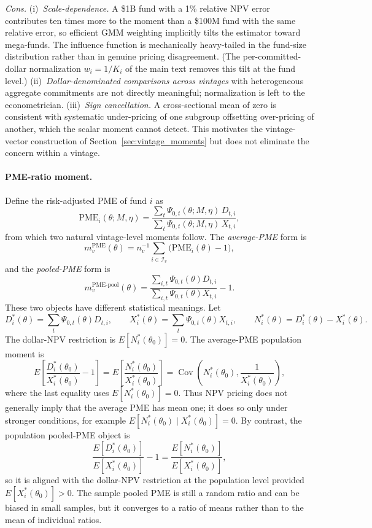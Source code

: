 \documentclass[11pt]{article}
\begin{document}
\emph{Cons.}
(i)~\emph{Scale-dependence.} A \$1B fund with a 1\% relative NPV error
contributes ten times more to the moment than a \$100M fund with the same
relative error, so efficient GMM weighting implicitly tilts the estimator
toward mega-funds. The influence function is mechanically heavy-tailed in
the fund-size distribution rather than in genuine pricing disagreement.
(The per-committed-dollar normalization \(w_i=1/K_i\) of the main text
removes this tilt at the fund level.)
(ii)~\emph{Dollar-denominated comparisons across vintages} with
heterogeneous aggregate commitments are not directly meaningful; normalization
is left to the econometrician.
(iii)~\emph{Sign cancellation.} A cross-sectional mean of zero is consistent
with systematic under-pricing of one subgroup offsetting over-pricing of
another, which the scalar moment cannot detect. This motivates the
vintage-vector construction of Section~\ref{sec:vintage_moments} but does not
eliminate the concern within a vintage.

\paragraph{PME-ratio moment.}
Define the risk-adjusted PME of fund \(i\) as
\[
\mathrm{PME}_i(\theta;M,\eta)
=\frac{\sum_{t}\Psi_{0,t}(\theta;M,\eta)\,D_{t,i}}
{\sum_{t}\Psi_{0,t}(\theta;M,\eta)\,X_{t,i}},
\]
from which two natural vintage-level moments follow. The \emph{average-PME}
form is
\[
m^{\mathrm{PME}}_{v}(\theta)
=
n_v^{-1}
\sum_{i\in \mathcal I_v}\bigl(\mathrm{PME}_i(\theta)-1\bigr),
\]
and the \emph{pooled-PME} form is
\[
m^{\mathrm{PME\text{-}pool}}_{v}(\theta)
=
\frac{\sum_{i,t}\Psi_{0,t}(\theta)D_{t,i}}
{\sum_{i,t}\Psi_{0,t}(\theta)X_{t,i}}
-1.
\]
These two objects have different statistical meanings. Let
\[
D_i^\ast(\theta)=\sum_t\Psi_{0,t}(\theta)D_{t,i},
\qquad
X_i^\ast(\theta)=\sum_t\Psi_{0,t}(\theta)X_{t,i},
\qquad
N_i^\ast(\theta)=D_i^\ast(\theta)-X_i^\ast(\theta).
\]
The dollar-NPV restriction is \(E[N_i^\ast(\theta_0)]=0\). The average-PME
population moment is
\[
E\!\left[\frac{D_i^\ast(\theta_0)}{X_i^\ast(\theta_0)}-1\right]
=
E\!\left[\frac{N_i^\ast(\theta_0)}{X_i^\ast(\theta_0)}\right]
=
\operatorname{Cov}\!\left(N_i^\ast(\theta_0),\frac{1}{X_i^\ast(\theta_0)}\right),
\]
where the last equality uses \(E[N_i^\ast(\theta_0)]=0\). Thus NPV pricing
does not generally imply that the average PME has mean one; it does so only
under stronger conditions, for example \(E[N_i^\ast(\theta_0)\mid
X_i^\ast(\theta_0)]=0\). By contrast, the population pooled-PME object is
\[
\frac{E[D_i^\ast(\theta_0)]}{E[X_i^\ast(\theta_0)]}-1
=
\frac{E[N_i^\ast(\theta_0)]}{E[X_i^\ast(\theta_0)]},
\]
so it is aligned with the dollar-NPV restriction at the population level
provided \(E[X_i^\ast(\theta_0)]>0\). The sample pooled PME is still a random
ratio and can be biased in small samples, but it converges to a ratio of
means rather than to the mean of individual ratios.
\end{document}
